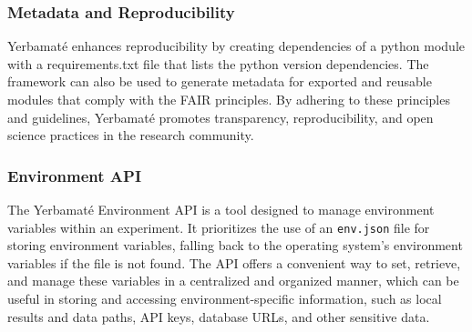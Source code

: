 
\subsubsection{Metadata and Reproducibility}

Yerbamaté enhances reproducibility by creating dependencies of a python module with a requirements.txt file that lists the python version dependencies. The framework can also be used to generate metadata for exported and reusable modules that comply with the FAIR principles. By adhering to these principles and guidelines, Yerbamaté promotes transparency, reproducibility, and open science practices in the research community.

\subsubsection{Environment API}

The Yerbamaté Environment API is a tool designed to manage environment variables within an experiment. It prioritizes the use of an \texttt{env.json} file for storing environment variables, falling back to the operating system's environment variables if the file is not found. The API offers a convenient way to set, retrieve, and manage these variables in a centralized and organized manner, which can be useful in storing and accessing environment-specific information, such as local results and data paths, API keys, database URLs, and other sensitive data.




